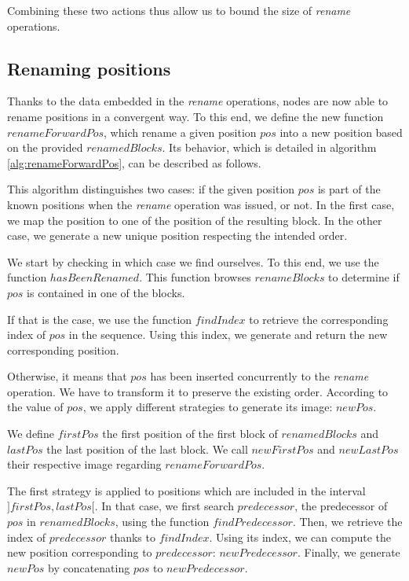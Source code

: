 \documentclass{article}
\theoremstyle{definition}
\begin{document}
Combining these two actions thus allow us to bound the size of \emph{rename} operations.

\subsection{Renaming positions}
\label{sec:renameForwardPos}

Thanks to the data embedded in the \emph{rename} operations, nodes are now able to rename positions in a convergent way.
To this end, we define the new function $renameForwardPos$, which rename a given position $pos$ into a new position based on the provided $renamedBlocks$.
Its behavior, which is detailed in algorithm \ref{alg:renameForwardPos}, can be described as follows.

This algorithm distinguishes two cases: if the given position $pos$ is part of the known positions when the \emph{rename} operation was issued, or not.
In the first case, we map the position to one of the position of the resulting block.
In the other case, we generate a new unique position respecting the intended order.

We start by checking in which case we find ourselves.
To this end, we use the function $hasBeenRenamed$.
This function browses $renameBlocks$ to determine if $pos$ is contained in one of the blocks.

If that is the case, we use the function $findIndex$ to retrieve the corresponding index of $pos$ in the sequence.
Using this index, we generate and return the new corresponding position.

Otherwise, it means that $pos$ has been inserted concurrently to the \emph{rename} operation. 
We have to transform it to preserve the existing order.
According to the value of $pos$, we apply different strategies to generate its image: $newPos$.

We define $firstPos$ the first position of the first block of $renamedBlocks$ and $lastPos$ the last position of the last block.
We call $newFirstPos$ and $newLastPos$ their respective image regarding $renameForwardPos$.

The first strategy is applied to positions which are included in the interval $]firstPos, lastPos[$.
In that case, we first search $predecessor$, the predecessor of $pos$ in $renamedBlocks$, using the function $findPredecessor$.
Then, we retrieve the index of $predecessor$ thanks to $findIndex$.
Using its index, we can compute the new position corresponding to $predecessor$: $newPredecessor$.
Finally, we generate $newPos$ by concatenating $pos$ to $newPredecessor$.
\end{document}
